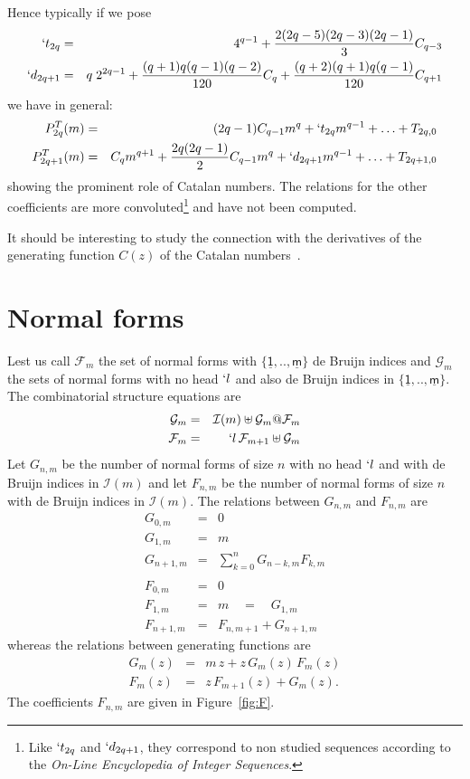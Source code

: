 \documentclass[preprint,authoryear]{elsarticle}
\newcommand{\F}{\mathcal{F}}
\newcommand{\G}{\mathcal{G}}
\newcommand{\Var}[1]{\underline{\mathsf{#1}}}
\begin{document}
Hence typically if we pose
\begin{eqnarray*}
  `t_{2q}&= & 4^{q-1} +  \frac{2 (2q - 5)  (2q - 3)  (2q -1)}{3}  C_{q-3} \\
  `d_{2q+1} &=& q\;2^{2q-1} +\frac{(q+1)q(q-1)(q-2)}{120}C_q+ \frac{(q+2)(q+1)q(q-1)}{120}C_{q+1}
\end{eqnarray*}
we have in general:
  \begin{eqnarray*}
P^T_{2q}(m) &=& (2q-1) C_{q-1} m^q + `t_{2q} m^{q-1} + \ldots + T_{2q,0}\\
P^T_{2q+1} (m) &=& C_q m^{q+1} + \frac{2q(2q-1)}{2} C_{q-1} m^{q} + `d_{2q+1} m^{q-1} + \ldots + T_{2q+1,0}
\end{eqnarray*}
showing the prominent role of Catalan numbers.  The relations for the other coefficients
are more convoluted\footnote{Like $`t_{2q}$ and $`d_{2q+1}$, they correspond to non
  studied sequences according to the \emph{On-Line Encyclopedia of Integer Sequences}.}
and have not been computed.

It should be interesting to study the connection with the derivatives of the generating
function $C(z)$ of the Catalan numbers~\cite{lang02:_polyn_cataly}. 
\section{Normal forms}
\label{sec:normal-forms}

Lest us call $\F_m$ the set of normal forms with $\{\Var{1},.., \Var{m}\}$ de Bruijn indices and $\G_m$ the sets
of normal forms with no head $`l$ and also  de Bruijn indices in $\{\Var{1},.., \Var{m}\}$.  The combinatorial structure equations are
\begin{eqnarray*}
  \G_m &=&  \mathcal{I}(m) \uplus \G_m @ \F_m\\
  \F_m &=& `l\,\F_{m+1} \uplus \G_m
\end{eqnarray*}
Let $G_{n,m}$ be the number of normal forms of size $n$ with no head $`l$ and with de
Bruijn indices in $\mathcal{I}(m)$ and let $F_{n,m}$ be the number of normal forms of size $n$
with de Bruijn indices in $\mathcal{I}(m)$.  The relations between $G_{n,m}$ and $F_{n,m}$
are
\begin{eqnarray*}
  G_{0,m} &=& 0\\
  G_{1,m} &=& m\\
  G_{n+1,m} &=& \sum_{k=0}^{n}G_{n-k,m} F_{k,m}\\\\
  F_{0,m} &=& 0\\
  F_{1,m} &=& m \quad = \quad G_{1,m} \\
  F_{n+1,m}&=& F_{n,m+1} + G_{n+1,m}
\end{eqnarray*}
whereas the relations between generating functions are
\begin{eqnarray*}
  G_m(z) &=& m\,z + z \,G_m(z)\,F_m(z)\\
  F_m(z) &=& z\, F_{m+1}(z) + G_m(z).
\end{eqnarray*}
The coefficients $F_{n,m}$ are given in Figure~\ref{fig:F}.  
\end{document}
